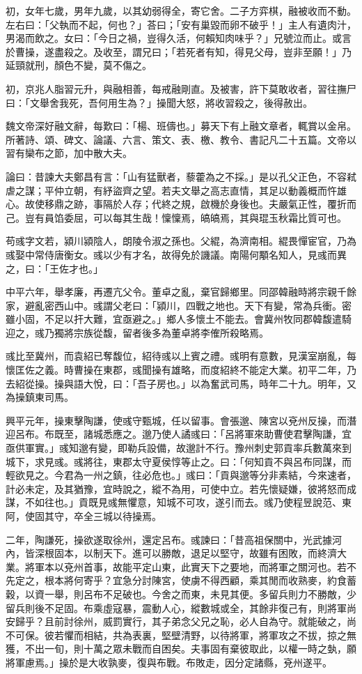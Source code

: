\begin{pinyinscope}
初，女年七歲，男年九歲，以其幼弱得全，寄它舍。二子方弈棋，融被收而不動。左右曰：「父執而不起，何也？」荅曰；「安有巢毀而卵不破乎！」主人有遺肉汁，男渴而飲之。女曰：「今日之禍，豈得久活，何賴知肉味乎？」兄號泣而止。或言於曹操，遂盡殺之。及收至，謂兄曰；「若死者有知，得見父母，豈非至願！」乃延頸就刑，顏色不變，莫不傷之。

初，京兆人脂習元升，與融相善，每戒融剛直。及被害，許下莫敢收者，習往撫尸曰：「文舉舍我死，吾何用生為？」操聞大怒，將收習殺之，後得赦出。

魏文帝深好融文辭，每歎曰：「楊、班儔也。」募天下有上融文章者，輒賞以金帛。所著詩、頌、碑文、論議、六言、策文、表、檄、教令、書記凡二十五篇。文帝以習有欒布之節，加中散大夫。

論曰：昔諫大夫鄭昌有言：「山有猛獸者，藜藿為之不採。」是以孔父正色，不容弒虐之謀；平仲立朝，有紓盜齊之望。若夫文舉之高志直情，其足以動義概而忤雄心。故使移鼎之跡，事隔於人存；代終之規，啟機於身後也。夫嚴氣正性，覆折而己。豈有員馅委屈，可以每其生哉！懍懍焉，皜皜焉，其與琨玉秋霜比質可也。

苟彧字文若，潁川潁陰人，朗陵令淑之孫也。父緄，為濟南相。緄畏憚宦官，乃為彧娶中常侍唐衡女。彧以少有才名，故得免於譏議。南陽何顒名知人，見彧而異之，曰：「王佐才也。」

中平六年，舉孝廉，再遷亢父令。董卓之亂，棄官歸鄉里。同邵韓融時將宗親千餘家，避亂密西山中。彧謂父老曰：「潁川，四戰之地也。天下有變，常為兵衝。密雖小固，不足以扞大難，宜亟避之。」鄉人多懷土不能去。會冀州牧同郡韓馥遣騎迎之，彧乃獨將宗族從馥，留者後多為董卓將李傕所殺略焉。

彧比至冀州，而袁紹已奪馥位，紹待彧以上賓之禮。彧明有意數，見漢室崩亂，每懷匡佐之義。時曹操在東郡，彧聞操有雄略，而度紹終不能定大業。初平二年，乃去紹從操。操與語大悅，曰：「吾子房也。」以為奮武司馬，時年二十九。明年，又為操鎮東司馬。

興平元年，操東擊陶謙，使彧守甄城，任以留事。會張邈、陳宮以兗州反操，而潛迎呂布。布既至，諸城悉應之。邈乃使人譎彧曰：「呂將軍來助曹使君擊陶謙，宜亟供軍實。」彧知邈有變，即勒兵設備，故邈計不行。豫州刺史郭貢率兵數萬來到城下，求見彧。彧將往，東郡太守夏侯惇等止之。曰：「何知貢不與呂布同謀，而輕欲見之。今君為一州之鎮，往必危也。」彧曰：「貢與邈等分非素結，今來速者，計必未定，及其猶豫，宜時說之，縱不為用，可使中立。若先懷疑嫌，彼將怒而成謀，不如往也。」貢既見彧無懼意，知城不可攻，遂引而去。彧乃使程昱說范、東阿，使固其守，卒全三城以待操焉。

二年，陶謙死，操欲遂取徐州，還定呂布。彧諫曰：「昔高祖保關中，光武據河內，皆深根固本，以制天下。進可以勝敵，退足以堅守，故雖有困敗，而終濟大業。將軍本以兗州首事，故能平定山東，此實天下之要地，而將軍之關河也。若不先定之，根本將何寄乎？宜急分討陳宮，使虜不得西顧，乘其閒而收熟麥，約食蓄穀，以資一舉，則呂布不足破也。今舍之而東，未見其便。多留兵則力不勝敵，少留兵則後不足固。布乘虛寇暴，震動人心，縱數城或全，其餘非復己有，則將軍尚安歸乎？且前討徐州，威罰實行，其子弟念父兄之恥，必人自為守。就能破之，尚不可保。彼若懼而相結，共為表裏，堅壁清野，以待將軍，將軍攻之不拔，掠之無獲，不出一旬，則十萬之眾未戰而自困矣。夫事固有棄彼取此，以權一時之埶，願將軍慮焉。」操於是大收孰麥，復與布戰。布敗走，因分定諸縣，兗州遂平。


\end{pinyinscope}
